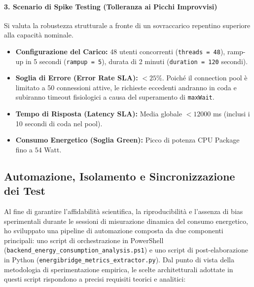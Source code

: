 \paragraph{3. Scenario di Spike Testing (Tolleranza ai Picchi Improvvisi)}
Si valuta la robustezza strutturale a fronte di un sovraccarico repentino superiore alla capacità nominale.
\begin{itemize}
    \item \textbf{Configurazione del Carico:} 48 utenti concorrenti (\texttt{threads = 48}), ramp-up in 5 secondi (\texttt{rampup = 5}), durata di 2 minuti (\texttt{duration = 120} secondi).
    \item \textbf{Soglia di Errore (Error Rate SLA):} $< 25\%$. Poiché il connection pool è limitato a 50 connessioni attive, le richieste eccedenti andranno in coda e subiranno timeout fisiologici a causa del superamento di \texttt{maxWait}.
    \item \textbf{Tempo di Risposta (Latency SLA):} Media globale $< 12000$ ms (inclusi i 10 secondi di coda nel pool).
    \item \textbf{Consumo Energetico (Soglia Green):} Picco di potenza CPU Package fino a $54$ Watt.
\end{itemize}

\subsection{Automazione, Isolamento e Sincronizzazione dei Test}

Al fine di garantire l'affidabilità scientifica, la riproducibilità e l'assenza di bias sperimentali durante le sessioni di misurazione dinamica del consumo energetico, ho sviluppato una pipeline di automazione composta da due componenti principali: uno script di orchestrazione in PowerShell (\texttt{backend\_energy\_consumption\_analysis.ps1}) e uno script di post-elaborazione in Python (\texttt{energibridge\_metrics\_extractor.py}). Dal punto di vista della metodologia di sperimentazione empirica, le scelte architetturali adottate in questi script rispondono a precisi requisiti teorici e analitici:

